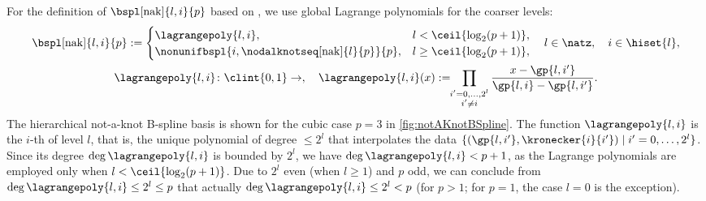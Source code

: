 For the definition of 
$\bspl[\nak]{l,i}{p}$ based on ,
we use global Lagrange polynomials for the coarser levels:
\begin{subequations}
  \label{eq:hierarchicalNotAKnotBSpline}
  \begin{gather}
    \bspl[\nak]{l,i}{p}
    :=
    \begin{cases}
      \lagrangepoly{l,i},&
      l < \ceil{\log_2(p+1)},\\
      \nonunifbspl{i,\nodalknotseq[\nak]{l}{p}}{p},&
      l \ge \ceil{\log_2(p+1)},
    \end{cases}\quad
    l \in \natz,\quad
    i \in \hiset{l},\\
    \lagrangepoly{l,i}\colon \clint{0, 1} \to \real,\quad
    \lagrangepoly{l,i}(x)
    := \!\!\prod_{\substack{i'=0,\dotsc,2^l\\i'\not=i}}
    \frac{x - \gp{l,i'}}{\gp{l,i} - \gp{l,i'}}.
  \end{gather}
\end{subequations}
The hierarchical not-a-knot B-spline basis is shown for the
cubic case $p = 3$ in \cref{fig:notAKnotBSpline}.
The function $\lagrangepoly{l,i}$ is the $i$-th
 of level $l$, that is,
the unique polynomial of degree $\le 2^l$ that interpolates the data
$\{(\gp{l,i'}, \kronecker{i}{i'}) \mid i' = 0, \dotsc, 2^l\}$.
Since its degree $\deg \lagrangepoly{l,i}$ is bounded by $2^l$,
we have $\deg \lagrangepoly{l,i} < p + 1$,
as the Lagrange polynomials are employed only when
$l < \ceil{\log_2(p+1)}$.
Due to $2^l$ even (when $l \ge 1$) and $p$ odd,
we can conclude from $\deg \lagrangepoly{l,i} \le 2^l \le p$ that actually
$\deg \lagrangepoly{l,i} \le 2^l < p$
(for $p > 1$; for $p = 1$, the case $l = 0$ is the exception).

